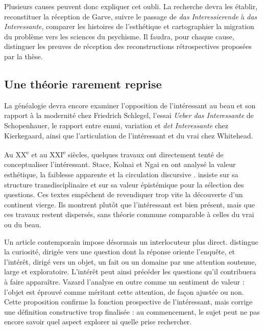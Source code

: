 \documentclass[11pt,a4paper]{article}
\begin{document}
Plusieurs causes peuvent donc expliquer cet oubli. La recherche devra les
établir, reconstituer la réception de Garve, suivre le passage de
\emph{das Interessierende} à \emph{das Interessante}, comparer les histoires de
l'esthétique et cartographier la migration du problème vers les sciences du
psychisme. Il faudra, pour chaque cause, distinguer les preuves de réception des
reconstructions rétrospectives proposées par la thèse.

\subsection{Une théorie rarement reprise}

La généalogie devra encore examiner l'opposition de l'intéressant au beau et son
rapport à la modernité chez Friedrich Schlegel, l'essai \emph{Ueber das
Interessante} de Schopenhauer, le rapport entre ennui, variation et
\emph{det Interessante} chez Kierkegaard, ainsi que l'articulation de
l'intéressant et du vrai chez Whitehead.

Au XX\textsuperscript{e} et au XXI\textsuperscript{e} siècles, quelques travaux
ont directement tenté de conceptualiser l'intéressant. Stace, Kolnai et Ngai en
ont analysé la valeur esthétique, la faiblesse apparente et la circulation
discursive
\parencite{stace1944interestingness,kolnai1964concept,ngai2008merely,ngai2012categories}.
\textcite{epstein2009interesting} insiste sur sa structure transdisciplinaire et
\textcite{grimm2011interesting} sur sa valeur épistémique pour la sélection des
questions. Ces textes empêchent de revendiquer trop vite la découverte d'un
continent vierge. Ils montrent plutôt que l'intéressant est bien présent, mais
que ces travaux restent dispersés, sans théorie commune comparable à celles du
vrai ou du beau.

Un article contemporain impose désormais un interlocuteur plus direct.
\textcite{vazard2026inquiry} distingue la curiosité, dirigée vers une question
dont la réponse oriente l'enquête, et l'intérêt, dirigé vers un objet, un fait ou
un domaine par une attention soutenue, large et exploratoire. L'intérêt peut
ainsi précéder les questions qu'il contribuera à faire apparaître. Vazard
l'analyse en outre comme un sentiment de valeur : l'objet est éprouvé comme
méritant cette attention, de façon ajustée ou non. Cette proposition confirme
la fonction prospective de l'intéressant, mais corrige une définition
constructive trop finalisée : au commencement, le sujet peut ne pas encore
savoir quel aspect explorer ni quelle prise rechercher.
\end{document}
